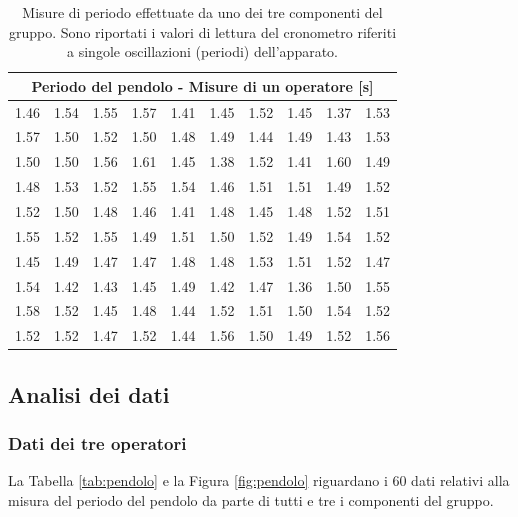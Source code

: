 \begin{table}
	\centering
	\begin{tabular} {c c c c c | c c c c c}
		\toprule
		\multicolumn{10}{c}{Periodo del pendolo - Misure di un operatore [s]} \\
		\midrule
		1.46 & 1.54 & 1.55 & 1.57 & 1.41 & 1.45 & 1.52 & 1.45 & 1.37 & 1.53 \\
		1.57 & 1.50 & 1.52 & 1.50 & 1.48 & 1.49 & 1.44 & 1.49 & 1.43 & 1.53 \\
		1.50 & 1.50 & 1.56 & 1.61 & 1.45 & 1.38 & 1.52 & 1.41 & 1.60 & 1.49 \\
		1.48 & 1.53 & 1.52 & 1.55 & 1.54 & 1.46 & 1.51 & 1.51 & 1.49 & 1.52 \\
		1.52 & 1.50 & 1.48 & 1.46 & 1.41 & 1.48 & 1.45 & 1.48 & 1.52 & 1.51 \\
		\midrule
		1.55 & 1.52 & 1.55 & 1.49 & 1.51 & 1.50 & 1.52 & 1.49 & 1.54 & 1.52 \\
		1.45 & 1.49 & 1.47 & 1.47 & 1.48 & 1.48 & 1.53 & 1.51 & 1.52 & 1.47 \\
		1.54 & 1.42 & 1.43 & 1.45 & 1.49 & 1.42 & 1.47 & 1.36 & 1.50 & 1.55 \\
		1.58 & 1.52 & 1.45 & 1.48 & 1.44 & 1.52 & 1.51 & 1.50 & 1.54 & 1.52 \\
		1.52 & 1.52 & 1.47 & 1.52 & 1.44 & 1.56 & 1.50 & 1.49 & 1.52 & 1.56 \\
	\bottomrule
	\end{tabular}
	\caption{Misure di periodo effettuate da uno dei tre componenti del gruppo.
        Sono riportati i valori di lettura del cronometro riferiti a singole oscillazioni
        (periodi) dell'apparato.}
    \label{tab:pendolo100}
\end{table}

\subsection{Analisi dei dati}

\subsubsection{Dati dei tre operatori}

La Tabella \ref{tab:pendolo} e la Figura \ref{fig:pendolo} riguardano i 60 dati
relativi alla misura del periodo del pendolo da parte di tutti e tre i
componenti del gruppo.

